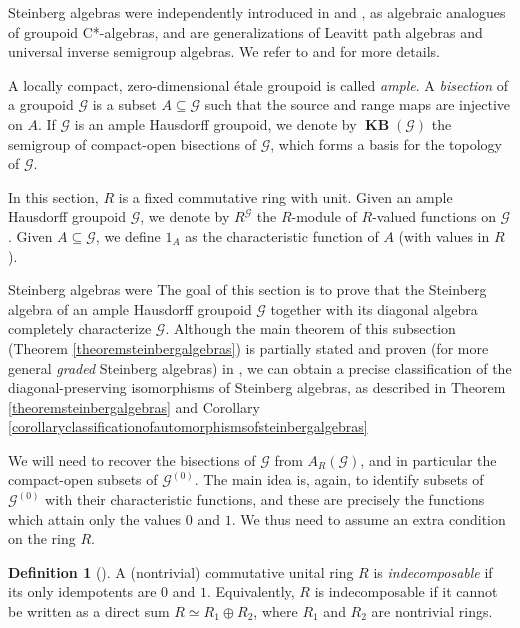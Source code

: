 \documentclass[letter,11pt]{amsart}
\theoremstyle{plain}		\newtheorem{theorem}[generalnumbering]{Theorem}
\theoremstyle{plain}		\newtheorem{corollary}[generalnumbering]{Corollary}
\theoremstyle{definition}		\newtheorem{definition}[generalnumbering]{Definition}
\theoremstyle{definition}		\newtheorem{example}[generalnumbering]{Example}
\theoremstyle{plain}		\newtheorem{proposition}[generalnumbering]{Proposition}
\theoremstyle{plain}		\newtheorem{lemma}[generalnumbering]{Lemma}
\theoremstyle{plain}    \newtheorem{plainstyle}[generalnumbering]{\namefordifferentenvironment}
\theoremstyle{plain}    \newtheorem*{plainstyle*}{\namefordifferentenvironment}
\theoremstyle{definition}    \newtheorem{definitionstyle}[generalnumbering]{\namefordifferentenvironment}
\theoremstyle{definition}    \newtheorem*{definitionstyle*}{\namefordifferentenvironment}
\DeclareMathOperator{\KB}{\mathbf{KB}}
\begin{document}
Steinberg algebras were independently introduced in \cite{MR2565546} and \cite{MR3274831}, as algebraic analogues of groupoid C*-algebras, and are generalizations of Leavitt path algebras and universal inverse semigroup algebras. We refer to \cite{MR3743184} and \cite{carlsenrout2017} for more details.

A locally compact, zero-dimensional étale groupoid is called \emph{ample}. A \emph{bisection} of a groupoid $\mathcal{G}$ is a subset $A\subseteq\mathcal{G}$ such that the source and range maps are injective on $A$. If $\mathcal{G}$ is an ample Hausdorff groupoid, we denote by $\KB(\mathcal{G})$ the semigroup of compact-open bisections of $\mathcal{G}$, which forms a basis for the topology of $\mathcal{G}$.

In this section, $R$ is a fixed commutative ring with unit. Given an ample Hausdorff groupoid $\mathcal{G}$, we denote by $R^{\mathcal{G}}$ the $R$-module of $R$-valued functions on $\mathcal{G}$. Given $A\subseteq\mathcal{G}$, we define $1_A$ as the characteristic function of $A$ (with values in $R$).


Steinberg algebras were The goal of this section is to prove that the Steinberg algebra of an ample Hausdorff groupoid $\mathcal{G}$ together with its diagonal algebra completely characterize $\mathcal{G}$. Although the main theorem of this subsection (Theorem \ref{theoremsteinbergalgebras}) is partially stated and proven (for more general \emph{graded} Steinberg algebras) in \cite[Corollary 3.14]{carlsenrout2017}, we can obtain a precise classification of the diagonal-preserving isomorphisms of Steinberg algebras, as described in Theorem \ref{theoremsteinbergalgebras} and Corollary \ref{corollaryclassificationofautomorphismsofsteinbergalgebras}

We will need to recover the bisections of $\mathcal{G}$ from $A_R(\mathcal{G})$, and in particular the compact-open subsets of $\mathcal{G}^{(0)}$. The main idea is, again, to identify subsets of $\mathcal{G}^{(0)}$ with their characteristic functions, and these are precisely the functions which attain only the values $0$ and $1$. We thus need to assume an extra condition on the ring $R$.

\begin{definition}[{\cite[X.7]{MR1878556}}]
	A (nontrivial) commutative unital ring $R$ is \emph{indecomposable} if its only idempotents are $0$ and $1$. Equivalently, $R$ is indecomposable if it cannot be written as a direct sum $R\simeq R_1\oplus R_2$, where $R_1$ and $R_2$ are nontrivial rings.
\end{definition}
\end{document}
